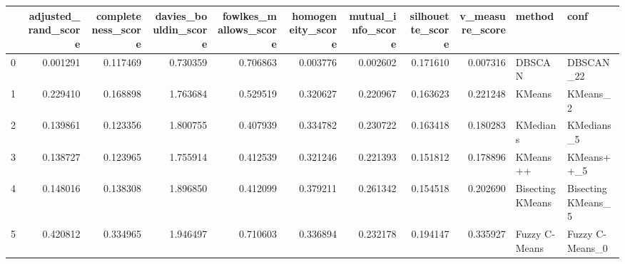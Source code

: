 \begin{tabular}{lrrrrrrrrll}
\toprule
{} &  adjusted\_rand\_score &  completeness\_score &  davies\_bouldin\_score &  fowlkes\_mallows\_score &  homogeneity\_score &  mutual\_info\_score &  silhouette\_score &  v\_measure\_score &            method &                conf \\
\midrule
0 &             0.001291 &            0.117469 &              0.730359 &               0.706863 &           0.003776 &           0.002602 &          0.171610 &         0.007316 &            DBSCAN &           DBSCAN\_22 \\
1 &             0.229410 &            0.168898 &              1.763684 &               0.529519 &           0.320627 &           0.220967 &          0.163623 &         0.221248 &            KMeans &            KMeans\_2 \\
2 &             0.139861 &            0.123356 &              1.800755 &               0.407939 &           0.334782 &           0.230722 &          0.163418 &         0.180283 &          KMedians &          KMedians\_5 \\
3 &             0.138727 &            0.123965 &              1.755914 &               0.412539 &           0.321246 &           0.221393 &          0.151812 &         0.178896 &          KMeans++ &          KMeans++\_5 \\
4 &             0.148016 &            0.138308 &              1.896850 &               0.412099 &           0.379211 &           0.261342 &          0.154518 &         0.202690 &  Bisecting KMeans &  Bisecting KMeans\_5 \\
5 &             0.420812 &            0.334965 &              1.946497 &               0.710603 &           0.336894 &           0.232178 &          0.194147 &         0.335927 &     Fuzzy C-Means &     Fuzzy C-Means\_0 \\
\bottomrule
\end{tabular}

